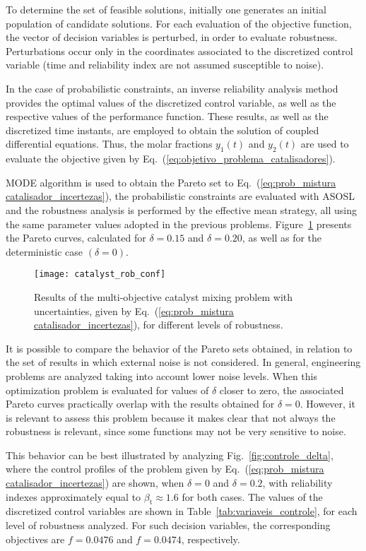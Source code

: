 \documentclass[final,5p,times,twocolumn,numbers]{elsarticle}
\begin{document}
To determine the set of feasible solutions, initially one generates an initial population of candidate solutions. For each evaluation of the objective function, the vector of decision variables is perturbed, in order to evaluate robustness. Perturbations occur only in the coordinates associated to the discretized control variable (time and reliability index are not assumed susceptible to noise).

In the case of probabilistic constraints, an inverse reliability analysis method provides the optimal values of the discretized control variable, as well as the respective values of the performance function. These results, as well as the discretized time instants, are employed to obtain the solution of coupled differential equations. Thus, the molar fractions $ y_{1} \left( t \right) $ and $ y_{2} \left( t \right) $ are used to evaluate the objective given by Eq.~(\ref{eq:objetivo_problema_catalisadores}).

MODE algorithm is used to obtain the Pareto set to Eq.~(\ref{eq:prob_mistura catalisador_incertezas}), the probabilistic constraints are evaluated with ASOSL and the robustness analysis is performed by the effective mean strategy, all using the same parameter values adopted in the previous problems. Figure~\ref{fig:catalyst_rob_conf} presents the Pareto curves, calculated for $ \delta = 0.15 $ and $ \delta = 0.20 $, as well as for the deterministic case $ \left( \delta = 0 \right) $.

\begin{figure}[!ht]
    \centering
    \texttt{[image: catalyst\_rob\_conf]}
    \caption{Results of the multi-objective catalyst mixing problem with uncertainties, given by Eq.~(\ref{eq:prob_mistura catalisador_incertezas}), for different levels of robustness.}
    \label{fig:catalyst_rob_conf}
\end{figure}

It is possible to compare the behavior of the Pareto sets obtained, in relation to the set of results in which external noise is not considered. In general, engineering problems are analyzed taking into account lower noise levels. When this optimization problem is evaluated for values of $ \delta $ closer to zero, the associated Pareto curves practically overlap with the results obtained for $ \delta = 0 $. However, it is relevant to assess this problem because it makes clear that not always the robustness is relevant, since some functions may not be very sensitive to noise.

This behavior can be best illustrated by analyzing Fig.~\ref{fig:controle_delta}, where the control profiles of the problem given by Eq.~(\ref{eq:prob_mistura catalisador_incertezas}) are shown, when $ \delta = 0 $ and $ \delta = 0.2 $, with reliability indexes approximately equal to $ \beta_{\mathrm{t}} \approx 1.6 $ for both cases. The values of the discretized control variables are shown in Table~\ref{tab:variaveis_controle}, for each level of robustness analyzed. For such decision variables, the corresponding objectives are $ f = 0.0476 $ and $ f = 0.0474 $, respectively.
\end{document}
